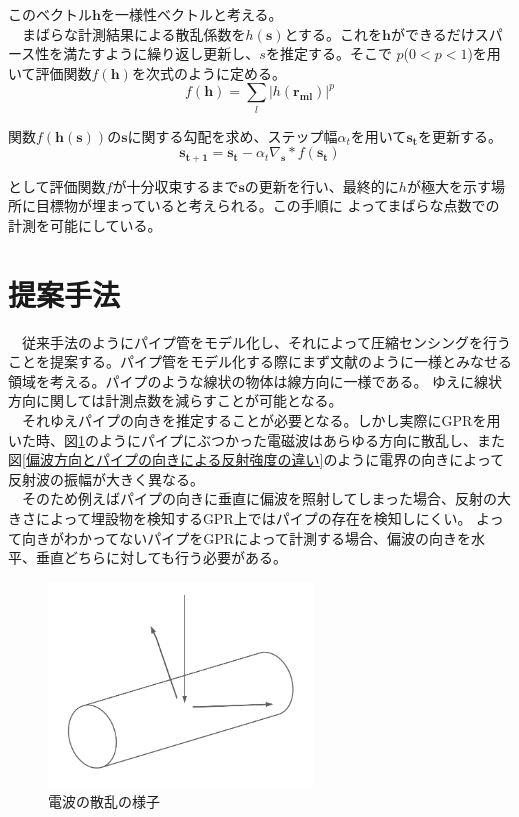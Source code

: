 \documentclass[12pt,a4paper]{jsreport}
\begin{document}
このベクトル$\bm{h}$を一様性ベクトルと考える。
\\　まばらな計測結果による散乱係数を$h(\bm{s})$とする。これを$\bm{h}$ができるだけスパース性を満たすように繰り返し更新し、$s$を推定する。そこで
$p$($0<p<1$)を用いて評価関数$f(\bm{h})$を次式のように定める。
\begin{equation}
  f(\bm{h})=\sum_{l}|h(\bm{r_{ml}})|^{p}
  \end{equation}

関数$f(\bm{h({\bm{s}})})$の$\bm{s}$に関する勾配を求め、ステップ幅$\alpha_{t}$を用いて$\bm{s_{t}}$を更新する。
\begin{equation}
  \bm{s_{t+1}}=\bm{s_{t}}-\alpha_{t}\nabla_{\bm{s}}*f(\bm{s_{t}})
  \end{equation}

として評価関数$f$が十分収束するまで$\bm{s}$の更新を行い、最終的に$h$が極大を示す場所に目標物が埋まっていると考えられる。この手順に
よってまばらな点数での計測を可能にしている。

\section{提案手法}
　従来手法のようにパイプ管をモデル化し、それによって圧縮センシングを行うことを提案する。パイプ管をモデル化する際にまず文献\cite{imai}のように一様とみなせる領域を考える。パイプのような線状の物体は線方向に一様である。
ゆえに線状方向に関しては計測点数を減らすことが可能となる。
\\　それゆえパイプの向きを推定することが必要となる。しかし実際にGPRを用いた時、図\ref{電波の散乱の様子}のようにパイプにぶつかった電磁波はあらゆる方向に散乱し、また
図\ref{偏波方向とパイプの向きによる反射強度の違い}のように電界の向きによって反射波の振幅が大きく異なる。
\\　そのため例えばパイプの向きに垂直に偏波を照射してしまった場合、反射の大きさによって埋設物を検知するGPR上ではパイプの存在を検知しにくい。
よって向きがわかってないパイプをGPRによって計測する場合、偏波の向きを水平、垂直どちらに対しても行う必要がある。

\begin{figure}[h]
  \begin{center}
   \includegraphics[width=7cm]{./image/scattering.pdf}
  \caption{電波の散乱の様子}\label{電波の散乱の様子}
  \end{center}
  \end{figure}
\end{document}

